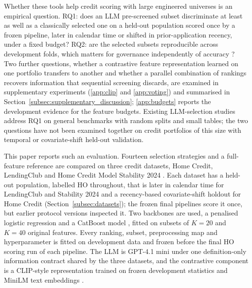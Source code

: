 \documentclass[final,5p,twocolumn]{elsarticle}
\newcommand{\Kfeat}{K}
\begin{document}
Whether these tools help credit scoring with large engineered universes is an empirical question. RQ1: does an LLM pre-screened subset discriminate at least as well as a classically selected one on a held-out population scored once by a frozen pipeline, later in calendar time or shifted in prior-application recency, under a fixed budget? RQ2: are the selected subsets reproducible across development folds, which matters for governance independently of accuracy \cite{kalousis2007,nogueira2018}? Two further questions, whether a contrastive feature representation learned on one portfolio transfers to another and whether a parallel combination of rankings recovers information that sequential screening discards, are examined in supplementary experiments (\ref{app:clip} and \ref{app:voting}) and summarised in Section~\ref{subsec:supplementary_discussion}; \ref{app:budgets} reports the development evidence for the feature budgets. Existing LLM-selection studies address RQ1 on general benchmarks with random splits and small tables; the two questions have not been examined together on credit portfolios of this size with temporal or covariate-shift held-out validation.

This paper reports such an evaluation. Fourteen selection strategies and a full-feature reference are compared on three credit datasets, Home Credit, LendingClub and Home Credit Model Stability 2024 \cite{homecredit2018,lendingclub_kaggle,homecredit2024}. Each dataset has a held-out population, labelled HO throughout, that is later in calendar time for LendingClub and Stability 2024 and a recency-based covariate-shift holdout for Home Credit (Section~\ref{subsec:datasets}); the frozen final pipelines score it once, but earlier protocol versions inspected it. Two backbones are used, a penalised logistic regression and a CatBoost model \cite{prokhorenkova2018}, fitted on subsets of $\Kfeat=20$ and $\Kfeat=40$ original features. Every ranking, subset, preprocessing map and hyperparameter is fitted on development data and frozen before the final HO scoring run of each pipeline. The LLM is GPT-4.1 mini \cite{openai2025gpt41} under one definition-only information contract shared by the three datasets, and the contrastive component is a CLIP-style representation trained on frozen development statistics and MiniLM text embeddings \cite{wang2020minilm,reimers2019}.
\end{document}
